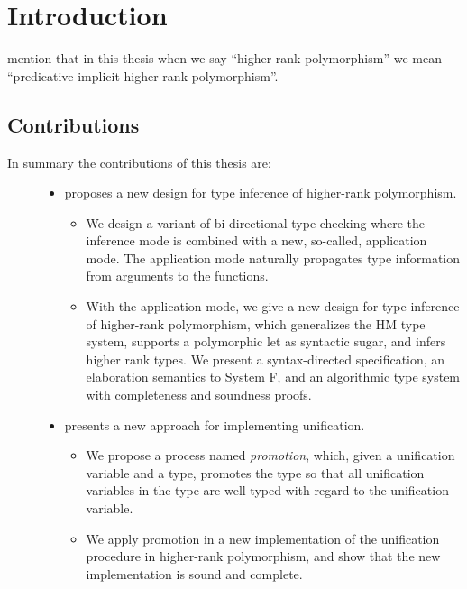 \chapter{Introduction}

mention that in this thesis when we say ``higher-rank polymorphism'' we mean
``predicative implicit higher-rank polymorphism''.

\section{Contributions}

In summary the contributions of this thesis are:


\begin{description}
\item[]
  \begin{itemize}
  \item {} proposes a new design for type inference of
    higher-rank polymorphism.
    \begin{itemize}
    \item We design a variant of bi-directional type checking
      where the inference mode is combined with a new, so-called, application
      mode. The application mode naturally propagates type information from
      arguments to the functions.
    \item With the application mode, we give a new design for type inference of
      higher-rank polymorphism, which generalizes the HM type system, supports a
      polymorphic let as syntactic sugar, and infers higher rank types. We
      present a syntax-directed specification, an elaboration semantics to
      System F, and an algorithmic type system with completeness and soundness
      proofs.
    \end{itemize}

  \item {} presents a new approach for implementing unification.
    \begin{itemize}
    \item We propose a process named \textit{promotion}, which, given a
      unification variable and a type, promotes the type so
      that all unification variables in the type are well-typed with regard to
      the unification variable.
    \item We apply promotion in a new implementation of the unification
      procedure in higher-rank polymorphism, and show that the new
      implementation is sound and complete.
    \end{itemize}
  \end{itemize}


\end{description}
